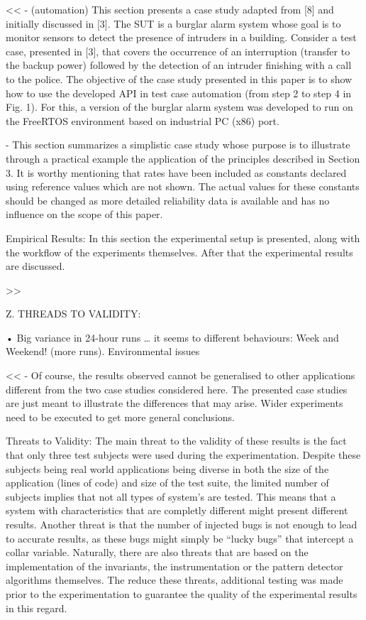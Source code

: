 \documentclass[runningheads,a4paper]{llncs}
\begin{document}
<<
- (automation) This section presents a case study adapted from [8] and initially discussed 
in [3]. The SUT is a burglar alarm system whose goal is to monitor sensors to detect
the presence of intruders in a building. Consider a test case, presented in [3],
that covers the occurrence of an interruption (transfer to the backup power)
followed by the detection of an intruder finishing with a call to the police. The
objective of the case study presented in this paper is to show how to use the
developed API in test case automation (from step 2 to step 4 in Fig. 1). For this,
a version of the burglar alarm system was developed to run on the FreeRTOS
environment based on industrial PC (x86) port.

- This section summarizes a simplistic case study whose purpose is to illustrate
through a practical example the application of the principles described in Section 3. It
is worthy mentioning that rates have been included as constants declared using
reference values which are not shown. The actual values for these constants should be
changed as more detailed reliability data is available and has no influence on the
scope of this paper.

Empirical Results: In this section the experimental setup is presented, along with the workflow of
the experiments themselves. After that the experimental results are discussed.

>>

Z. THREADS TO VALIDITY:

•	Big variance in 24-hour runs … it seems to different behaviours: Week and
Weekend! (more runs). Environmental issues

<<
- Of course, the results observed cannot be generalised to other applications
different from the two case studies considered here. The presented case studies
are just meant to illustrate the differences that may arise. Wider experiments
need to be executed to get more general conclusions.

Threats to Validity: The main threat to the validity of these results is the fact that only 
three test subjects were used during the experimentation. Despite these subjects being
real world applications being diverse in both the size of the application (lines of
code) and size of the test suite, the limited number of subjects implies that not
all types of system’s are tested. This means that a system with characteristics
that are completly different might present different results.
Another threat is that the number of injected bugs is not enough to lead to
accurate results, as these bugs might simply be “lucky bugs” that intercept a
collar variable.
Naturally, there are also threats that are based on the implementation of the
invariants, the instrumentation or the pattern detector algorithms themselves.
The reduce these threats, additional testing was made prior to the experimentation
to guarantee the quality of the experimental results in this regard.
\end{document}
